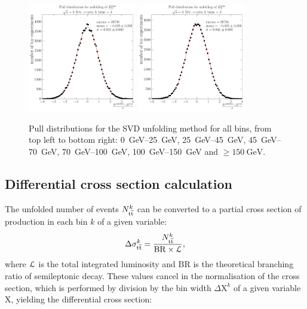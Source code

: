 \begin{figure}[hbtp]
    \includegraphics[width=0.42\textwidth]{unfolding_performance/pull_from_files_bin_4_stats_89700}
    \includegraphics[width=0.42\textwidth]{unfolding_performance/pull_from_files_bin_5_stats_89700}
    \caption[Pull distributions for the SVD unfolding]{Pull distributions for the SVD unfolding method for all \MET
    bins, from top left to bottom right: \SIrange{0}{25}{\GeV}, \SIrange{25}{45}{\GeV}, \SIrange{45}{70}{\GeV},
    \SIrange{70}{100}{\GeV}, \SIrange{100}{150}{\GeV} and $\geq \SI{150}{\GeV}$.}
    \label{fig:met_SVD_pull}
\end{figure}

\subsection{Differential cross section calculation}
\label{ss_xsection:calculation}

The unfolded number of \ttbar events $N_{\mathrm{t}\overline{\mathrm{t}}}^k$ can be converted to a partial cross section of \ttbar production in
each bin $k$ of a given variable:
\begin{equation}
\label{eq:partial_xsection}
\Delta\sigma_{\mathrm{t}\overline{\mathrm{t}}}^k = \frac{N_{\mathrm{t}\overline{\mathrm{t}}}^k}{\mathrm{BR} \times {\cal L}},
\end{equation}
where $\cal L$ is the total integrated luminosity and $\mathrm{BR}$ is the theoretical branching ratio of semileptonic
\ttbar decay. These values cancel in the normalisation of the cross section, which is performed by division by the bin
width $\Delta \mathrm{X}^k$ of a given variable $\mathrm{X}$, yielding the differential cross section:

